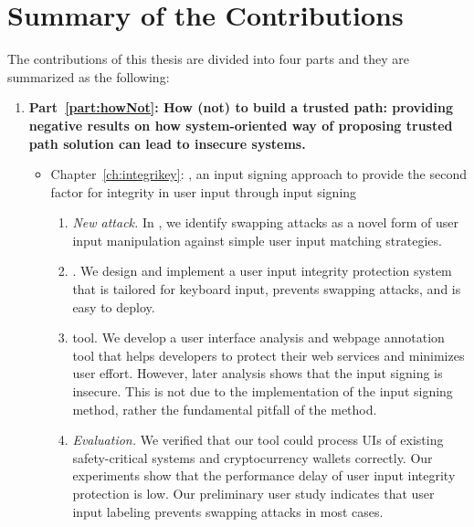 \section{Summary of the Contributions}

The contributions of this thesis are divided into four parts and they are summarized as the following:

\begin{enumerate}[leftmargin=*]
  
  \item[] \textbf{Part~\ref{part:howNot}: How (not) to build a trusted path: providing negative results on how system-oriented way of proposing trusted path solution can lead to insecure systems.}
  
  \begin{itemize}
  \item Chapter~\ref{ch:integrikey}: \integrikey, an input signing approach to provide the second factor for integrity in user input through input signing

\begin{enumerate}
    \item \emph{New attack.} In \integrikey, we identify swapping attacks as a novel form of user input manipulation against simple user input matching strategies.
    \item \integrikey. We design and implement a user input integrity protection system that is tailored for keyboard input, prevents swapping attacks, and is easy to deploy.
    \item \integrikey{} tool. We develop a user interface analysis and webpage annotation tool that helps developers to protect their web services and minimizes user effort. However, later analysis shows that the input signing is insecure. This is not due to the implementation of the input signing method, rather the fundamental pitfall of the method.
    \item \emph{Evaluation.} We verified that our tool could process UIs of existing safety-critical systems and cryptocurrency wallets correctly. Our experiments show that the performance delay of \integrikey user input integrity protection is low. Our preliminary user study indicates that user input labeling prevents swapping attacks in most cases.
\end{enumerate}


\end{itemize}
\end{enumerate}

